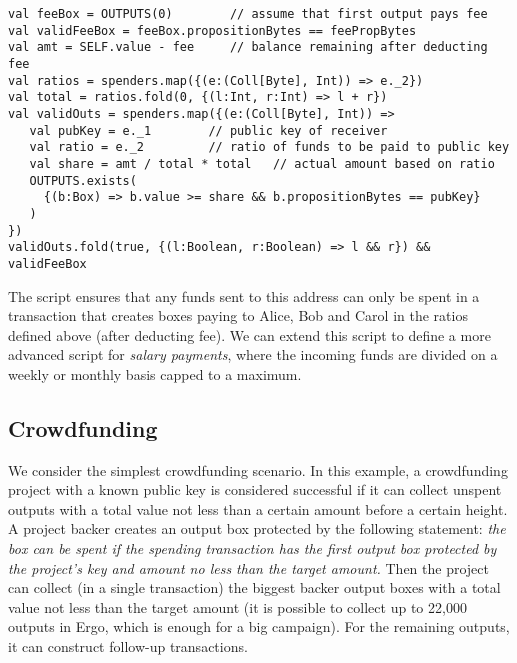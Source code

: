 \documentclass[runningheads]{llncs}
\begin{document}
\begin{verbatim}
val feeBox = OUTPUTS(0)        // assume that first output pays fee
val validFeeBox = feeBox.propositionBytes == feePropBytes
val amt = SELF.value - fee     // balance remaining after deducting fee
val ratios = spenders.map({(e:(Coll[Byte], Int)) => e._2})
val total = ratios.fold(0, {(l:Int, r:Int) => l + r})
val validOuts = spenders.map({(e:(Coll[Byte], Int)) =>
   val pubKey = e._1        // public key of receiver
   val ratio = e._2         // ratio of funds to be paid to public key
   val share = amt / total * total   // actual amount based on ratio
   OUTPUTS.exists(
     {(b:Box) => b.value >= share && b.propositionBytes == pubKey}
   )
})
validOuts.fold(true, {(l:Boolean, r:Boolean) => l && r}) && validFeeBox
\end{verbatim}

The script ensures that any funds sent to this address can only be spent in a transaction that creates boxes paying to Alice, Bob and Carol in the ratios defined above (after deducting fee).
We can extend this script to define a more advanced script for {\em salary payments}, where the incoming funds are divided on a weekly or monthly basis capped to a maximum. 

\subsection{Crowdfunding}
\label{crowfunding}

We consider the simplest crowdfunding scenario. In this example, a crowdfunding project with a known public key is considered successful if it can collect unspent outputs with a total value not less than a certain amount before a certain height. A project backer creates an output box protected by the following statement: {\em the box can be spent if the spending transaction has the first output box protected by the project’s key and amount no less than the target amount.} Then the project can collect (in a single transaction) the biggest
backer output boxes with a total value not less than the target amount (it
is possible to collect up to 22,000 outputs in Ergo, which is enough for a big campaign). For the remaining outputs, it can construct
follow-up transactions.
\end{document}
